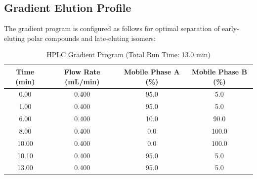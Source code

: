 \subsection{Gradient Elution Profile}
The gradient program is configured as follows for optimal separation of early-eluting polar compounds and late-eluting isomers:
\begin{table}[h]
\centering
\begin{tabularx}{\textwidth}{c c c c}
    \toprule
    \textbf{Time (min)} & \textbf{Flow Rate (mL/min)} & \textbf{Mobile Phase A (\%)} & \textbf{Mobile Phase B (\%)} \\
    \midrule
    0.00 & 0.400 & 95.0 & 5.0 \\
    1.00 & 0.400 & 95.0 & 5.0 \\
    6.00 & 0.400 & 10.0 & 90.0 \\
    8.00 & 0.400 & 0.0 & 100.0 \\
    10.00 & 0.400 & 0.0 & 100.0 \\
    10.10 & 0.400 & 95.0 & 5.0 \\
    13.00 & 0.400 & 95.0 & 5.0 \\
    \bottomrule
\end{tabularx}
\caption{HPLC Gradient Program (Total Run Time: 13.0 min)}
\end{table}
